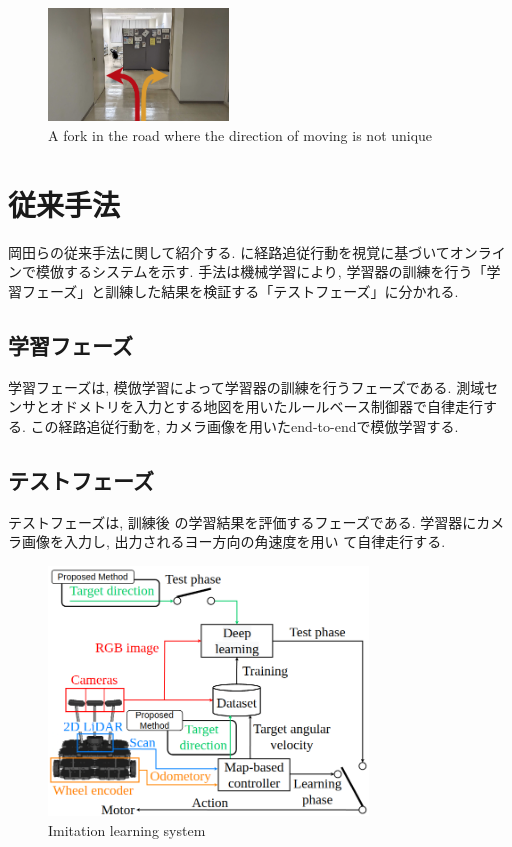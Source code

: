 \documentclass{jarticle}
\begin{document}
\begin{figure}[h]
 \centering
  \includegraphics[height=30mm]{road.png}
  \vspace*{-4mm}
  \caption{A fork in the road where the direction of moving is not unique}
  \label{fig: fig1}
\end{figure}

\section{従来手法}
岡田らの従来手法に関して紹介する. に経路追従行動を視覚に基づいてオンラインで模倣するシステムを示す. 手法は機械学習により, 学習器の訓練を行う「学習フェーズ」と訓練した結果を検証する「テストフェーズ」に分かれる.

\subsection{学習フェーズ}
学習フェーズは, 模倣学習によって学習器の訓練を行うフェーズである. 測域センサとオドメトリを入力とする地図を用いたルールベース制御器で自律走行する. この経路追従行動を, カメラ画像を用いたend-to-endで模倣学習する.

\subsection{テストフェーズ}
テストフェーズは, 訓練後 の学習結果を評価するフェーズである. 学習器にカメ ラ画像を入力し, 出力されるヨー方向の角速度を用い て自律走行する.

\begin{figure}[h]
  \centering
   \includegraphics[width=85mm]{system2.png}
   \vspace*{-4mm}
   \caption{Imitation learning system}
   \label{fig: fig2}
 \end{figure}
\end{document}
